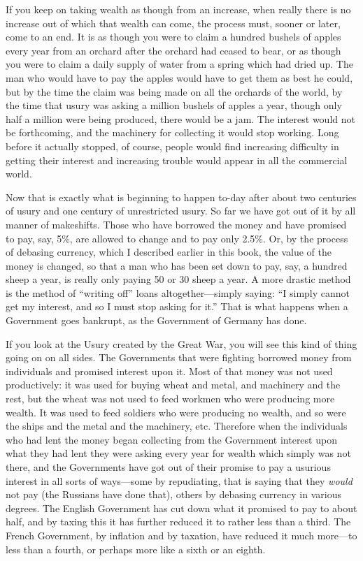 \documentclass{book}
\begin{document}
If you keep on taking wealth as though from an increase, when really there is no increase out of which that wealth can come, the process must, sooner or later, come to an end. It is as though you were to claim a hundred bushels of apples every year from an orchard after the orchard had ceased to bear, or as though you were to claim a daily supply of water from a spring which had dried up. The man who would have to pay the apples would have to get them as best he could, but by the time the claim was being made on all the orchards of the world, by the time that usury was asking a million bushels of apples a year, though only half a million were being produced, there would be a jam. The interest would not be forthcoming, and the machinery for collecting it would stop working. Long before it actually stopped, of course, people would find increasing difficulty in getting their interest and increasing trouble would appear in all the commercial world.

Now that is exactly what is beginning to happen to-day after about two centuries of usury and one century of unrestricted usury. So far we have got out of it by all manner of makeshifts. Those who have borrowed the money and have promised to pay, say, 5\%, are allowed to change and to pay only 2.5\%. Or, by the process of debasing currency, which I described earlier in this book, the value of the money is changed, so that a man who has been set down to pay, say, a hundred sheep a year, is really only paying 50 or 30 sheep a year. A more drastic method is the method of “writing off” loans altogether—simply saying: “I simply cannot get my interest, and so I must stop asking for it.” That is what happens when a Government goes bankrupt, as the Government of Germany has done.

If you look at the Usury created by the Great War, you will see this kind of thing going on on all sides. The Governments that were fighting borrowed money from individuals and promised interest upon it. Most of that money was not used productively: it was used for buying wheat and metal, and machinery and the rest, but the wheat was not used to feed workmen who were producing more wealth. It was used to feed soldiers who were producing no wealth, and so were the ships and the metal and the machinery, etc. Therefore when the individuals who had lent the money began collecting from the Government interest upon what they had lent they were asking every year for wealth which simply was not there, and the Governments have got out of their promise to pay a usurious interest in all sorts of ways—some by repudiating, that is saying that they \emph{would} not pay (the Russians have done that), others by debasing currency in various degrees. The English Government has cut down what it promised to pay to about half, and by taxing this it has further reduced it to rather less than a third. The French Government, by inflation and by taxation, have reduced it much more—to less than a fourth, or perhaps more like a sixth or an eighth.
\end{document}
